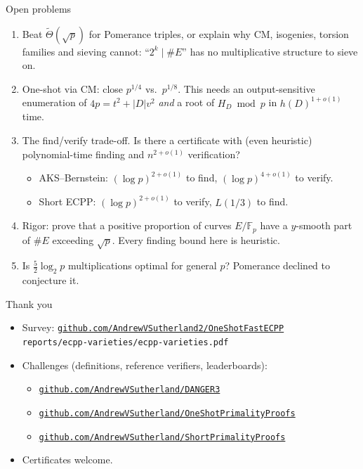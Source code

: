 \documentclass[aspectratio=169,11pt]{beamer}
\newcommand{\F}{\mathbb{F}}
\newcommand{\Tt}{\widetilde{\Theta}}
\newcommand{\find}[1]{{\color{fred}#1}}
\newcommand{\ver}[1]{{\color{vblue}#1}}
\begin{document}
\begin{frame}{Open problems}
\begin{enumerate}
\item Beat \find{$\Tt(\sqrt p)$} for Pomerance triples, or explain why CM, isogenies, torsion
families and sieving cannot: ``$2^k \mid \#E$'' has no multiplicative structure to sieve on.
\medskip
\item One-shot via CM: close \find{$p^{1/4}$} vs.\ \find{$p^{1/8}$}.  This needs an
output-sensitive enumeration of $4p = t^2 + |D|v^2$ \emph{and} a root of $H_D \bmod p$ in
$h(D)^{1+o(1)}$ time.
\medskip
\item \alert{The find/verify trade-off.}  Is there a certificate with (even heuristic)
polynomial-time finding and $n^{2+o(1)}$ verification?
\begin{itemize}
\item AKS--Bernstein: \find{$(\log p)^{2+o(1)}$} to find, \ver{$(\log p)^{4+o(1)}$} to verify.
\item Short ECPP: \ver{$(\log p)^{2+o(1)}$} to verify, \find{$L(1/3)$} to find.
\end{itemize}
\medskip
\item Rigor: prove that a positive proportion of curves $E/\F_p$ have a $y$-smooth part of
$\#E$ exceeding $\sqrt p$.  Every finding bound here is heuristic.
\medskip
\item Is $\tfrac52\log_2 p$ multiplications optimal for general $p$?  Pomerance declined to
conjecture it.
\end{enumerate}
\end{frame}

\begin{frame}{Thank you}
\begin{itemize}
\item Survey:
\href{https://github.com/AndrewVSutherland2/OneShotFastECPP/blob/main/reports/ecpp-varieties/ecpp-varieties.pdf}
{\texttt{github.com/AndrewVSutherland2/OneShotFastECPP}}\\
\hspace*{1em}\texttt{reports/ecpp-varieties/ecpp-varieties.pdf}
\bigskip
\item Challenges (definitions, reference verifiers, leaderboards):
\begin{itemize}
\item \href{https://github.com/AndrewVSutherland/DANGER3}{\texttt{github.com/AndrewVSutherland/DANGER3}}
\item \href{https://github.com/AndrewVSutherland/OneShotPrimalityProofs}{\texttt{github.com/AndrewVSutherland/OneShotPrimalityProofs}}
\item \href{https://github.com/AndrewVSutherland/ShortPrimalityProofs}{\texttt{github.com/AndrewVSutherland/ShortPrimalityProofs}}
\end{itemize}
\bigskip
\item Certificates welcome.
\end{itemize}
\end{frame}
\end{document}
